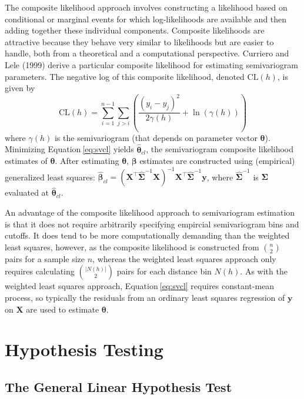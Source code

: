 \documentclass{article}
\begin{document}
The composite likelihood approach involves constructing a likelihood
based on conditional or marginal events for which log-likelihoods are
available and then adding together these individual components.
Composite likelihoods are attractive because they behave very similar to
likelihoods but are easier to handle, both from a theoretical and a
computational perspective. Curriero and Lele (1999) derive a particular
composite likelihood for estimating semivariogram parameters. The
negative log of this composite likelihood, denoted \(\text{CL}(h)\), is
given by \begin{equation}\label{eq:svcl}
  \text{CL}(h) = \sum_{i = 1}^{n - 1} \sum_{j > i} \left( \frac{(y_i - y_j)^2}{2\gamma(h)} + \ln(\gamma(h)) \right)
\end{equation} where \(\gamma(h)\) is the semivariogram (that depends on
parameter vector \(\bm{\theta}\)). Minimizing Equation\(~\)\ref{eq:svcl}
yields \(\bm{\hat{\theta}}_{cl}\), the semivariogram composite
likelihood estimates of \(\bm{\theta}\). After estimating
\(\bm{\theta}\), \(\bm{\beta}\) estimates are constructed using
(empirical) generalized least squares:
\(\bm{\hat{\beta}}_{cl} = (\mathbf{X}^\intercal \hat{\mathbf{\Sigma}}^{-1} \mathbf{X})^{-1} \mathbf{X}^\intercal \hat{\mathbf{\Sigma}}^{-1} \mathbf{y}\),
where \(\hat{\mathbf{\Sigma}}^{-1}\) is \(\mathbf{\Sigma}\) evaluated at
\(\bm{\hat{\theta}}_{cl}\).

An advantage of the composite likelihood approach to semivariogram
estimation is that it does not require arbitrarily specifying empircial
semivariogram bins and cutoffs. It does tend to be more computationally
demanding than the weighted least squares, however, as the composite
likelihood is constructed from \(\binom{n}{2}\) pairs for a sample size
\(n\), whereas the weighted least squares approach only requires
calculating \(\binom{|N(h)|}{2}\) pairs for each distance bin \(N(h)\).
As with the weighted least squares approach, Equation\(~\)\ref{eq:svcl}
requires constant-mean process, so typically the residuals from an
ordinary least squares regression of \(\mathbf{y}\) on \(\mathbf{X}\)
are used to estimate \(\bm{\theta}\).

\hypertarget{hypothesis-testing}{%
\section{Hypothesis Testing}\label{hypothesis-testing}}

\hypertarget{the-general-linear-hypothesis-test}{%
\subsection{The General Linear Hypothesis
Test}\label{the-general-linear-hypothesis-test}}
\end{document}
